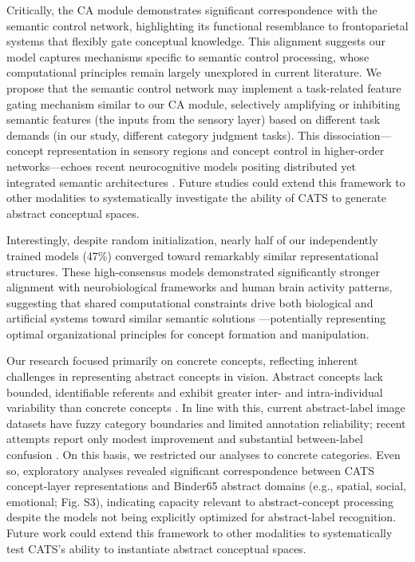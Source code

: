 \documentclass[pdflatex,sn-mathphys-num,lineno]{sn-jnl}%
\begin{document}
\begin{CJK}{UTF8}{gbsn}
Critically, the CA module demonstrates significant correspondence with the semantic control network, highlighting its functional resemblance to frontoparietal systems that flexibly gate conceptual knowledge. This alignment suggests our model captures mechanisms specific to semantic control processing, whose computational principles remain largely unexplored in current literature. We propose that the semantic control network may implement a task-related feature gating mechanism similar to our CA module, selectively amplifying or inhibiting semantic features (the inputs from the sensory layer) based on different task demands (in our study, different category judgment tasks). This dissociation—concept representation in sensory regions and concept control in higher-order networks—echoes recent neurocognitive models positing distributed yet integrated semantic architectures \cite{ralph_neural_2017}. Future studies could extend this framework to other modalities to systematically investigate the ability of CATS to generate abstract conceptual spaces.

Interestingly, despite random initialization, nearly half of our independently trained models (47\%) converged toward remarkably similar representational structures. These high-consensus models demonstrated significantly stronger alignment with neurobiological frameworks and human brain activity patterns, suggesting that shared computational constraints drive both biological and artificial systems toward similar semantic solutions \cite{carandini_normalization_2012}—potentially representing optimal organizational principles for concept formation and manipulation.

Our research focused primarily on concrete concepts, reflecting inherent challenges in representing abstract concepts in vision. Abstract concepts lack bounded, identifiable referents \cite{borghi_challenge_2017} and exhibit greater inter- and intra-individual variability than concrete concepts \cite{barsalou_abstraction_2003}. In line with this, current abstract-label image datasets have fuzzy category boundaries and limited annotation reliability; recent attempts report only modest improvement and substantial between-label confusion \cite{martinezpandiani_hypericons_2023,pandiani_seeing_2024}. On this basis, we restricted our analyses to concrete categories. Even so, exploratory analyses revealed significant correspondence between CATS concept-layer representations and Binder65 abstract domains (e.g., spatial, social, emotional; Fig. S3), indicating capacity relevant to abstract-concept processing despite the models not being explicitly optimized for abstract-label recognition. Future work could extend this framework to other modalities to systematically test CATS’s ability to instantiate abstract conceptual spaces.


\end{CJK}
\end{document}
